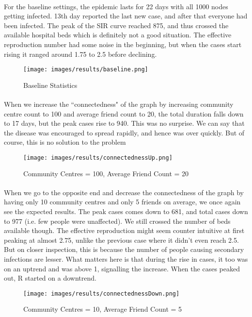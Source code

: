 \documentclass[12pt, a4paper]{extarticle}
\begin{document}
    \paragraph{} For the baseline settings, the epidemic lasts for 22 days with all 1000 nodes getting infected. 13th day reported the last new case, and after that everyone had been infected. The peak of the SIR curve reached 875, and thus crossed the available hospital beds which is definitely not a good situation. The effective reproduction number had some noise in the beginning, but when the cases start rising it ranged around 1.75 to 2.5 before declining.
    \vspace{0.2in}
    \begin{figure}[h]
        \centering
        \texttt{[image: images/results/baseline.png]}
        \caption{Baseline Statistics}
    \end{figure}
    
    \newpage
    \paragraph{} When we increase the ``connectedness" of the graph by increasing community centre count to 100 and average friend count to 20, the total duration falls down to 17 days, but the peak cases rise to 940. This was no surprise. We can say that the disease was encouraged to spread rapidly, and hence was over quickly. But of course, this is no solution to the problem
    \vspace{0.2in}
    \begin{figure}[h]
        \centering
        \texttt{[image: images/results/connectednessUp.png]}
        \caption{Community Centres = 100, Average Friend Count = 20}
    \end{figure}
    
    \newpage
    \paragraph{} When we go to the opposite end and decrease the connectedness of the graph by having only 10 community centres and only 5 friends on average, we once again see the expected results. The peak cases comes down to 681, and total cases down to 977 (i.e. few people were unaffected). We still crossed the number of beds available though. The effective reproduction might seem counter intuitive at first peaking at almost 2.75, unlike the previous case where it didn't even reach 2.5. But on closer inspection, this is because the number of people causing secondary infections are lesser. What matters here is that during the rise in cases, it too was on an uptrend and was above 1, signalling the increase. When the cases peaked out, R started on a downtrend.
    \vspace{0.2in}
    \begin{figure}[h]
        \centering
        \texttt{[image: images/results/connectednessDown.png]}
        \caption{Community Centres = 10, Average Friend Count = 5}
    \end{figure}
    
\end{document}
